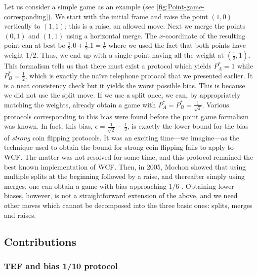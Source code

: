 \documentclass{theoretics}
\begin{document}
Let us consider a simple game
as an example (see  \cref{fig:Point-game-corresponding}). We start with the initial frame and raise the point
$(1,0)$ vertically to
$(1,1)$; this is a raise,
an allowed move. Next we merge
the points
$( 0,1)$ and $(1,1)$ using a horizontal merge. The $x$-coordinate
of the resulting point can at best be $\frac{1}{2}.0+\frac{1}{2}.1=\frac{1}{2}$
where we used the fact that both points have weight $1/2$. Thus, we
end up with a single point having all the weight at
$(\frac{1}{2},1)$.
This formalism tells us that there must exist a protocol which
yields $P_{A}^{*}=1$ while $P_{B}^{*}=\frac{1}{2}$, which is exactly the naïve telephone protocol that we presented earlier. It is a
neat consistency check but it yields the worst possible bias. This is because
we did not use the split move. If we use a split once, we can, by appropriately
matching the weights, already obtain a game with $P_{A}^{*}=P_{B}^{*}=\frac{1}{\sqrt{2}}$.
Various protocols corresponding to this bias were found
\cite{SR02,NS03,KerenidisNayak04} before the point game formalism was
known. In fact, this bias,
$\epsilon=\frac{1}{\sqrt{2}}-\frac{1}{2}$, is exactly the lower
bound for the bias of \emph{strong} coin flipping protocols. It was an exciting time---we
imagine---as the technique used to obtain the bound for strong coin flipping fails to apply to WCF. The matter was not resolved for some time, and this
protocol remained the best known implementation of WCF. Then, in 2005, Mochon showed that using multiple
%
splits at the beginning followed by a raise, and thereafter simply using merges, one can obtain a game with bias approaching $1/6$ \cite{Mochon05}. %
Obtaining lower biases, however, is not a straightforward extension of the above, and we need other moves which cannot be decomposed into the three basic ones:  splits, merges and raises.


\subsection{Contributions\label{subsec:Contributions}}

%
\subsubsection{TEF and bias 1/10 protocol}\label{subsubsec:contrtef}

%
\end{document}
